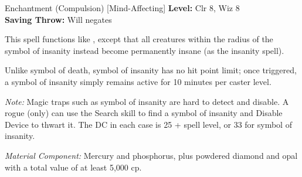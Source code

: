 {Enchantment (Compulsion) [Mind-Affecting]}
{
	\textbf{Level:}
	Clr 8, Wiz 8\\
	\textbf{Saving Throw:}
	Will negates\\
}
{
	This spell functions like , except that all creatures within the radius of the symbol of insanity instead become permanently insane (as the insanity spell).

	Unlike symbol of death, symbol of insanity has no hit point limit; once triggered, a symbol of insanity simply remains active for 10 minutes per caster level.

	\textit{Note:} Magic traps such as symbol of insanity are hard to detect and disable. A rogue (only) can use the Search skill to find a symbol of insanity and Disable Device to thwart it. The DC in each case is 25 + spell level, or 33 for symbol of insanity.

	\textit{Material Component:}
	Mercury and phosphorus, plus powdered diamond and opal with a total value of at least 5,000 cp.

}
